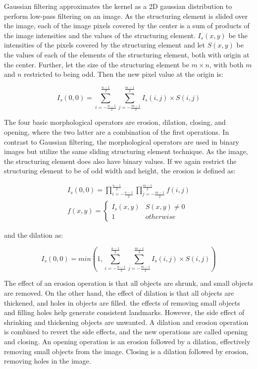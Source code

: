 Gaussian filtering approximates the kernel as a 2D gaussian distribution to perform low-pass filtering on an image. As the structuring element is slided over the image, each of the image pixels covered by the center is a sum of products of the image intensities and the values of the structuring element. $I_s(x,y)$ be the intensities of the pixels covered by the structuring element and let $S(x,y)$ be the values of each of the elements of the structuring element, both with origin at the center. Further, let the size of the structuring element be $m\times n$, with both $m$ and $n$ restricted to being odd. Then the new pixel value at the origin is:

\begin{equation}
    I_s(0,0) = \sum_{i = -\frac{n-1}{2}}^\frac{n-1}{2} \sum_{j = -\frac{m-1}{2}}^\frac{m-1}{2} I_s(i,j) \times S(i,j)
    \label{eq:gaussian_blur}
\end{equation}

The four basic morphological operators are erosion, dilation, closing, and opening, where the two latter are a combination of the first operations. In contrast to Gaussian filtering, the morphological operators are used in binary images but utilize the same sliding structuring element technique. As the image, the structuring element does also have binary values. If we again restrict the structuring element to be of odd width and height, the erosion is defined as: 

\begin{equation}
    \begin{split}
        I_s(0,0) = \prod_{i = -\frac{n-1}{2}}^\frac{n-1}{2} \prod_{j = -\frac{m-1}{2}}^\frac{m-1}{2} f(i,j) \\
        f(x,y) = 
        \begin{cases}
        I_s(x,y) & S(x,y) \neq 0 \\
        1 & otherwise
        \end{cases}
    \end{split}
    \label{eq:erosion}
\end{equation}

and the dilation as:

\begin{equation}
    I_s(0,0) = min(1, \sum_{i = -\frac{n-1}{2}}^\frac{n-1}{2} \sum_{j = -\frac{m-1}{2}}^\frac{m-1}{2} I_s(i,j) \times S(i,j))
    \label{eq:dialation}
\end{equation}

The effect of an erosion operation is that all objects are shrunk, and small objects are removed. On the other hand, the effect of dilation is that all objects are thickened, and holes in objects are filled. the effects of removing small objects and filling holes help generate consistent landmarks. However, the side effect of shrinking and thickening objects are unwanted. A dilation and erosion operation is combined to revert the side effects, and the new operations are called opening and closing. An opening operation is an erosion followed by a dilation, effectively removing small objects from the image. Closing is a dilation followed by erosion, removing holes in the image. 



